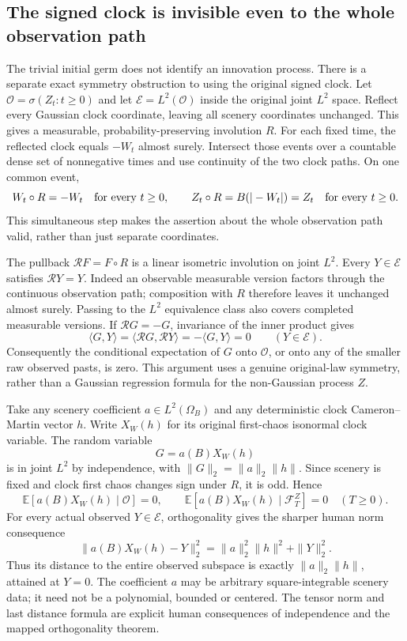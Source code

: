\documentclass[11pt]{article}
\theoremstyle{remark}\newtheorem{remark}[theorem]{Remark}
\newcommand{\E}{\mathbb E}
\begin{document}
\subsection*{The signed clock is invisible even to the whole observation path}
The trivial initial germ does not identify an innovation process.
There is a separate exact symmetry obstruction to using the
original signed clock. Let $\mathcal O=\sigma(Z_t:t\geq0)$ and
let $\mathcal E=L^2(\mathcal O)$ inside the original joint $L^2$
space. Reflect every Gaussian clock coordinate, leaving all
scenery coordinates unchanged. This gives a measurable,
probability-preserving involution $R$. For each fixed time,
the reflected clock equals $-W_t$ almost surely. Intersect those
events over a countable dense set of nonnegative times and use
continuity of the two clock paths. On one common event,
\[
 W_t\circ R=-W_t\quad\hbox{for every }t\geq0,
 \qquad Z_t\circ R=B(|-W_t|)=Z_t\quad\hbox{for every }t\geq0.
\]
This simultaneous step makes the assertion about the whole
observation path valid, rather than just separate coordinates.

The pullback $\mathcal R F=F\circ R$ is a linear isometric
involution on joint $L^2$. Every $Y\in\mathcal E$ satisfies
$\mathcal RY=Y$. Indeed an observable measurable version factors
through the continuous observation path; composition with $R$
therefore leaves it unchanged almost surely. Passing to the
$L^2$ equivalence class also covers completed measurable versions.
If $\mathcal RG=-G$, invariance of the inner product gives
\[
 \langle G,Y\rangle=\langle\mathcal RG,\mathcal RY\rangle
                  =-\langle G,Y\rangle=0
       \qquad(Y\in\mathcal E).
\]
Consequently the conditional expectation of $G$ onto $\mathcal O$,
or onto any of the smaller raw observed pasts, is zero. This
argument uses a genuine original-law symmetry, rather than a
Gaussian regression formula for the non-Gaussian process $Z$.

Take any scenery coefficient $a\in L^2(\Omega_B)$ and any
deterministic clock Cameron--Martin vector $h$. Write $X_W(h)$
for its original first-chaos isonormal clock variable. The
random variable
\[
 G=a(B)X_W(h)
\]
is in joint $L^2$ by independence, with
$\|G\|_2=\|a\|_2\|h\|$. Since scenery is fixed and clock first
chaos changes sign under $R$, it is odd. Hence
\begin{equation}\label{eq:hiddenclock}
 \E[a(B)X_W(h)\mid\mathcal O]=0,
 \qquad\E[a(B)X_W(h)\mid\mathcal F_T^Z]=0
       \quad(T\geq0).
\end{equation}
For every actual observed $Y\in\mathcal E$, orthogonality gives
the sharper human norm consequence
\[
 \|a(B)X_W(h)-Y\|_2^2
        =\|a\|_2^2\|h\|^2+\|Y\|_2^2.
\]
Thus its distance to the entire observed subspace is exactly
$\|a\|_2\|h\|$, attained at $Y=0$. The coefficient $a$ may be
arbitrary square-integrable scenery data; it need not be a
polynomial, bounded or centered. The tensor norm and last
distance formula are explicit human consequences of independence
and the mapped orthogonality theorem.
\end{document}
